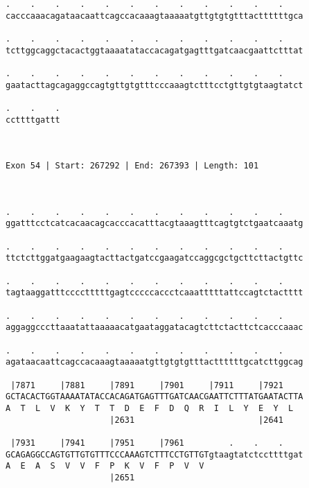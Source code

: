 \documentclass{article}
\begin{document}
\begin{Verbatim}
.    .    .    .    .    .    .    .    .    .    .    .    
cacccaaacagataacaattcagccacaaagtaaaaatgttgtgtgtttacttttttgca
                                                            
.    .    .    .    .    .    .    .    .    .    .    .    
tcttggcaggctacactggtaaaatataccacagatgagtttgatcaacgaattctttat
                                                            
.    .    .    .    .    .    .    .    .    .    .    .    
gaatacttagcagaggccagtgttgtgtttcccaaagtctttcctgttgtgtaagtatct
                                                            
.    .    .
ccttttgattt
           
           
 
Exon 54 | Start: 267292 | End: 267393 | Length: 101



.    .    .    .    .    .    .    .    .    .    .    .    
ggatttcctcatcacaacagcacccacatttacgtaaagtttcagtgtctgaatcaaatg
                                                            
.    .    .    .    .    .    .    .    .    .    .    .    
ttctcttggatgaagaagtacttactgatccgaagatccaggcgctgcttcttactgttc
                                                            
.    .    .    .    .    .    .    .    .    .    .    .    
tagtaaggatttcccctttttgagtcccccaccctcaaatttttattccagtctactttt
                                                            
.    .    .    .    .    .    .    .    .    .    .    .    
aggaggcccttaaatattaaaaacatgaataggatacagtcttctacttctcacccaaac
                                                            
.    .    .    .    .    .    .    .    .    .    .    .    
agataacaattcagccacaaagtaaaaatgttgtgtgtttacttttttgcatcttggcag
                                                            
 |7871     |7881     |7891     |7901     |7911     |7921    
GCTACACTGGTAAAATATACCACAGATGAGTTTGATCAACGAATTCTTTATGAATACTTA
A  T  L  V  K  Y  T  T  D  E  F  D  Q  R  I  L  Y  E  Y  L  
                     |2631                         |2641    
  
 |7931     |7941     |7951     |7961         .    .    .    
GCAGAGGCCAGTGTTGTGTTTCCCAAAGTCTTTCCTGTTGTgtaagtatctccttttgat
A  E  A  S  V  V  F  P  K  V  F  P  V  V                    
                     |2651                                  
  

\end{Verbatim}
\end{document}
